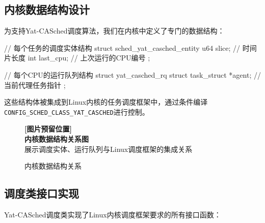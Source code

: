 \subsection{内核数据结构设计}

为支持Yat-CASched调度算法，我们在内核中定义了专门的数据结构：

\begin{tcolorbox}[
    colback=yellow!5!white,
    colframe=orange!50!black,
    title=\textbf{核心数据结构实现},
    fonttitle=\bfseries,
    arc=3pt
]
\begin{code}
// 每个任务的调度实体结构
struct sched_yat_casched_entity {
    u64 slice;           // 时间片长度
    int last_cpu;        // 上次运行的CPU编号
};

// 每个CPU的运行队列结构  
struct yat_casched_rq {
    struct task_struct *agent;  // 当前代理任务指针
};
\end{code}
\end{tcolorbox}

这些结构体被集成到Linux内核的任务调度框架中，通过条件编译\texttt{CONFIG\_\allowbreak SCHED\_\allowbreak CLASS\_\allowbreak YAT\_\allowbreak CASCHED}进行控制。

\begin{figure}[htbp]
\centering
\begin{tcolorbox}[
    colback=gray!10,
    colframe=gray!50,
    width=0.85\textwidth,
    center,
    arc=3pt
]
\centering
\textbf{[图片预留位置]}\\
\textbf{内核数据结构关系图}\\
\footnotesize{展示调度实体、运行队列与Linux调度框架的集成关系}
\end{tcolorbox}
\caption{内核数据结构关系}
\label{fig:kernel_structure}
\end{figure}

\subsection{调度类接口实现}

Yat-CASched调度类实现了Linux内核调度框架要求的所有接口函数：

